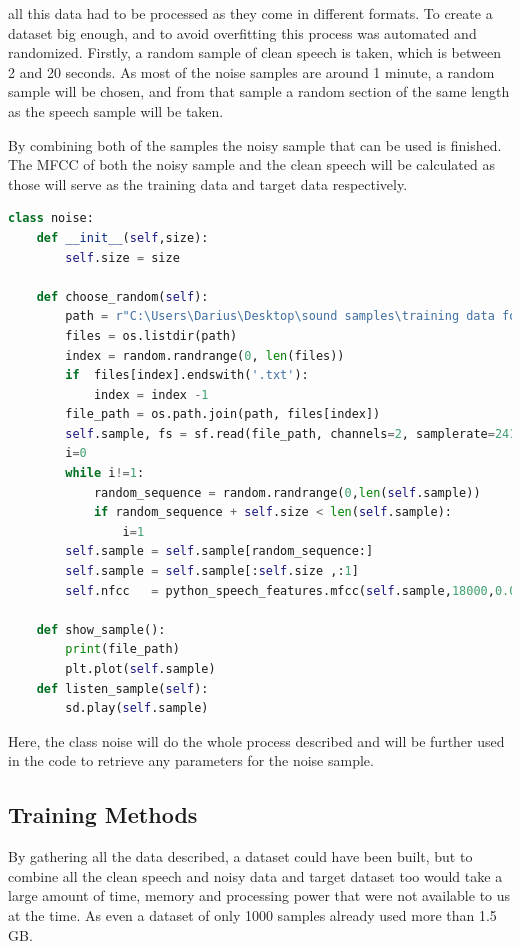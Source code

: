 all this data had to be processed as they come in different formats.
To create a dataset big enough, and to avoid overfitting this process was automated and randomized. Firstly, a random sample of clean speech is taken, which is between 2 and 20 seconds. As most of the noise samples are around 1 minute, a random sample will be chosen, and from that sample a random section of the same length as the speech sample will be taken.

By combining both of the samples the noisy sample that can be used is finished.
The MFCC of both the noisy sample and the clean speech will be calculated as those will serve as the training data and target data respectively.

\begin{lstlisting}[language=Python, caption=Noise sample gathering class]
class noise:
    def __init__(self,size):
        self.size = size
    
    def choose_random(self):
        path = r"C:\Users\Darius\Desktop\sound samples\training data for RNN\rnnoise_contributions"
        files = os.listdir(path)
        index = random.randrange(0, len(files))
        if  files[index].endswith('.txt'):
            index = index -1
        file_path = os.path.join(path, files[index])
        self.sample, fs = sf.read(file_path, channels=2, samplerate=24100,format='RAW', subtype='PCM_16')
        i=0
        while i!=1:
            random_sequence = random.randrange(0,len(self.sample))
            if random_sequence + self.size < len(self.sample):
                i=1
        self.sample = self.sample[random_sequence:]
        self.sample = self.sample[:self.size ,:1]
        self.nfcc   = python_speech_features.mfcc(self.sample,18000,0.025,0.01,24)
        
    def show_sample():
        print(file_path)
        plt.plot(self.sample)
    def listen_sample(self):
        sd.play(self.sample) 

\end{lstlisting}

Here, the class noise will do the whole process described and will be further used in the code to retrieve any parameters for the noise sample.
\newpage
\subsection{Training Methods}
By gathering all the data described, a dataset could have been built, but to combine all the clean speech and noisy data and target dataset too would take a large amount of time, memory and processing power that were not available to us at the time. As even  a dataset of only 1000 samples already used more than 1.5 GB.

